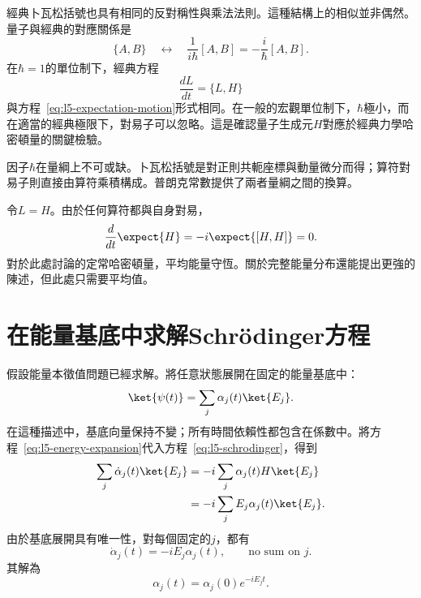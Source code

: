 經典卜瓦松括號也具有相同的反對稱性與乘法法則。這種結構上的相似並非偶然。量子與經典的對應關係是
\begin{equation}
\{A,B\}
\quad\longleftrightarrow\quad
\frac{1}{i\hbar}[A,B]
=-\frac{i}{\hbar}[A,B].
\label{eq:l5-poisson-correspondence}
\end{equation}
在\(\hbar=1\)的單位制下，經典方程
\begin{equation}
\frac{dL}{dt}=\{L,H\}
\end{equation}
與方程~\eqref{eq:l5-expectation-motion}形式相同。在一般的宏觀單位制下，\(\hbar\)極小，而在適當的經典極限下，對易子可以忽略。這是確認量子生成元\(H\)對應於經典力學哈密頓量的關鍵檢驗。

因子\(\hbar\)在量綱上不可或缺。卜瓦松括號是對正則共軛座標與動量微分而得；算符對易子則直接由算符乘積構成。普朗克常數提供了兩者量綱之間的換算。

令\(L=H\)。由於任何算符都與自身對易，
\begin{equation}
\frac{d}{dt}\expect{H}
=-i\expect{[H,H]}=0.
\end{equation}
對於此處討論的定常哈密頓量，平均能量守恆。關於完整能量分布還能提出更強的陳述，但此處只需要平均值。

\begin{classroomqa}
\end{classroomqa}

\begin{classroomqa}
\end{classroomqa}

\section{在能量基底中求解Schr\"odinger方程}

假設能量本徵值問題已經求解。將任意狀態展開在固定的能量基底中：
\begin{equation}
\ket{\psi(t)}=\sum_j\alpha_j(t)\ket{E_j}.
\label{eq:l5-energy-expansion}
\end{equation}
在這種描述中，基底向量保持不變；所有時間依賴性都包含在係數中。將方程~\eqref{eq:l5-energy-expansion}代入方程~\eqref{eq:l5-schrodinger}，得到
\begin{align}
\sum_j\dot\alpha_j(t)\ket{E_j}
&=-i\sum_j\alpha_j(t)H\ket{E_j}\\
&=-i\sum_j E_j\alpha_j(t)\ket{E_j}.
\end{align}
由於基底展開具有唯一性，對每個固定的\(j\)，都有
\begin{equation}
\dot\alpha_j(t)=-iE_j\alpha_j(t),
\qquad\text{no sum on \(j\)}.
\end{equation}
其解為
\begin{equation}
\alpha_j(t)=\alpha_j(0)e^{-iE_jt}.
\label{eq:l5-energy-phase}
\end{equation}

